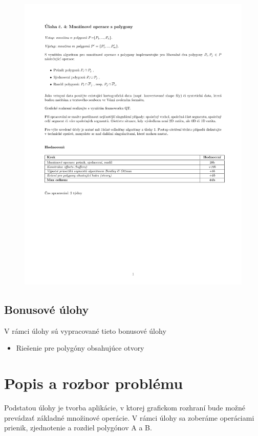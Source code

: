 \documentclass[12pt]{article}
\begin{document}
\begin{figure}[h!]
	\includegraphics[clip, trim=0cm 4cm 0cm 3cm, width=1.2\textwidth]{zadani.pdf}
\end{figure}
\subsection{Bonusové úlohy}
V rámci úlohy sú vypracované tieto bonusové úlohy

\begin{itemize}
\item Riešenie pre polygóny obsahujúce otvory
\end{itemize}

\clearpage 
\section{Popis a rozbor problému}
Podstatou úlohy je tvorba aplikácie, v ktorej grafickom rozhraní bude možné prevádzať základné množinové operácie. V rámci úlohy sa zoberáme operáciami prienik, zjednotenie a rozdiel polygónov A a B.
\end{document}
